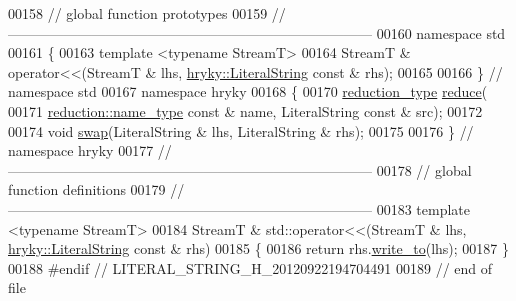 \begin{DoxyCode}
00158 \textcolor{comment}{// global function prototypes}
00159 \textcolor{comment}{//
      ------------------------------------------------------------------------------}
00160 \textcolor{keyword}{namespace }std
00161 \{
00163     \textcolor{keyword}{template} <\textcolor{keyword}{typename} StreamT>
00164     StreamT & operator<<(StreamT & lhs, \hyperlink{classhryky_1_1_literal_string}{hryky::LiteralString} \textcolor{keyword}{const} & rhs);
00165 
00166 \} \textcolor{comment}{// namespace std}
00167 \textcolor{keyword}{namespace }hryky
00168 \{
00170     \hyperlink{namespacehryky_a343a9a4c36a586be5c2693156200eadc}{reduction_type} \hyperlink{namespacehryky_af41cb3af6766761da0ff21b84527a52c}{reduce}(
00171         \hyperlink{namespacehryky_1_1reduction_ac686c30a4c8d196bbd0f05629a6b921f}{reduction::name_type} \textcolor{keyword}{const} & name, LiteralString \textcolor{keyword}{const} & src);
00172 
00174     \textcolor{keywordtype}{void} \hyperlink{namespacehryky_a4282146df5ea2b68cb667896a2205909}{swap}(LiteralString & lhs, LiteralString & rhs);
00175 
00176 \} \textcolor{comment}{// namespace hryky}
00177 \textcolor{comment}{//
      ------------------------------------------------------------------------------}
00178 \textcolor{comment}{// global function definitions}
00179 \textcolor{comment}{//
      ------------------------------------------------------------------------------}
00183 \textcolor{comment}{}\textcolor{keyword}{template} <\textcolor{keyword}{typename} StreamT>
00184 StreamT & std::operator<<(StreamT & lhs, \hyperlink{classhryky_1_1_literal_string}{hryky::LiteralString} \textcolor{keyword}{const} & rhs)
00185 \{
00186     \textcolor{keywordflow}{return} rhs.\hyperlink{classhryky_1_1_literal_string_ab6cbb2ab10459a946ef3d186d1014178}{write_to}(lhs);
00187 \}
00188 \textcolor{preprocessor}{#endif // LITERAL\_STRING\_H\_20120922194704491}
00189 \textcolor{preprocessor}{}\textcolor{comment}{// end of file}
\end{DoxyCode}
